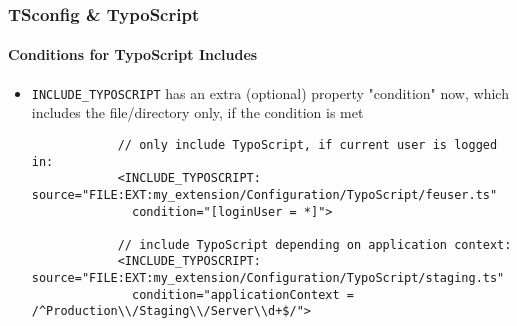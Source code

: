 %
\begin{frame}[fragile]
	\frametitle{TSconfig \& TypoScript}
	\framesubtitle{Conditions for TypoScript Includes}

	\lstset{basicstyle=\tiny\ttfamily}

	\begin{itemize}

		\item \texttt{INCLUDE\_TYPOSCRIPT} has an extra (optional) property "condition" now, which
			includes the file/directory only, if the condition is met

		\begin{lstlisting}
			// only include TypoScript, if current user is logged in:
			<INCLUDE_TYPOSCRIPT: source="FILE:EXT:my_extension/Configuration/TypoScript/feuser.ts"
			  condition="[loginUser = *]">

			// include TypoScript depending on application context:
			<INCLUDE_TYPOSCRIPT: source="FILE:EXT:my_extension/Configuration/TypoScript/staging.ts"
			  condition="applicationContext = /^Production\\/Staging\\/Server\\d+$/">
		\end{lstlisting}

	\end{itemize}

\end{frame}

